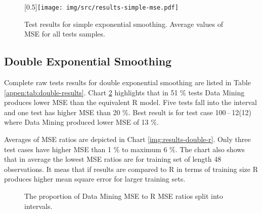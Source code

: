         \begin{figure}[H]
            \begin{center}
                \scalebox{0.65}[0.5]{\texttt{[image: img/src/results-simple-mse.pdf]}}
                \caption{Test results for simple exponential smoothing. Average values of MSE for all tests samples.}
                \label{img:results-simple-mse}
            \end{center}
        \end{figure}

        \subsection{Double Exponential Smoothing} \label{sec:results-double}
        Complete raw tests results for double exponential smoothing are listed in Table \ref{appen:tab:double-results}.
        Chart \ref{img:results-double-pie} highlights that in 51 \% tests Data Mining produces lower MSE than the
        equivalent R model. Five tests fall into the interval \interval[{1.1,1.2}] and one test has higher
        MSE than 20 \%. Best result is for test case 100\,--\,12(12) where Data Mining produced lower MSE of 13 \%.

        Averages of MSE ratios are depicted in Chart \ref{img:results-double-r}. Only three test cases have higher
        MSE than 1 \% to maximum 6 \%. The chart also shows that in average the
        lowest MSE ratios are for training set of length 48 observations. It meas that if results are compared to
        R in terms of training size R produces higher mean square error for larger training sets.

        \begin{figure}[H]
            \begin{center}
                \caption{The proportion of Data Mining MSE to R MSE ratios split into intervals.}
                \label{img:results-double-pie}
            \end{center}
        \end{figure}

